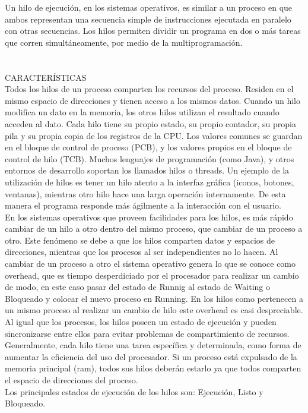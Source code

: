\documentclass[conference]{IEEEtran}
\begin{document}
Un hilo de ejecución, en los sistemas operativos, es similar a un proceso en que ambos representan una secuencia simple de instrucciones ejecutada en paralelo con otras secuencias. Los hilos permiten dividir un programa en dos o más tareas que corren simultáneamente, por medio de la multiprogramación. 
\\
\\
\\
CARACTERÍSTICAS 
\\
Todos los hilos de un proceso comparten los recursos del proceso. Residen en el mismo espacio de direcciones y tienen acceso a los mismos datos. Cuando un hilo modifica un dato en la memoria, los otros hilos utilizan el resultado cuando acceden al dato. Cada hilo tiene su propio estado, su propio contador, su propia pila y su propia  copia de los registros de la CPU. Los valores comunes se guardan en el bloque de control de proceso (PCB), y los valores propios en el bloque de control de hilo (TCB).
Muchos lenguajes de programación (como Java), y otros entornos de desarrollo soportan los llamados hilos o threads.
Un ejemplo de la utilización de hilos es tener un hilo atento a la interfaz gráfica (iconos, botones, ventanas), mientras otro hilo hace una larga operación internamente.
De esta manera el programa responde más ágilmente a la interacción con el usuario.
\\
En los sistemas operativos que proveen facilidades para los hilos, es más rápido cambiar de un hilo a otro dentro del mismo proceso, que cambiar de un proceso a otro. Este fenómeno se debe a que los hilos comparten datos y espacios de direcciones, mientras que los procesos al ser independientes no lo hacen. Al cambiar de un proceso a otro el sistema operativo genera lo que se conoce como overhead, que es tiempo desperdiciado por el procesador para realizar un cambio de modo, en este caso pasar del estado de Runnig al estado de Waiting o Bloqueado y colocar el nuevo proceso en Running. En los hilos como pertenecen a un mismo proceso al realizar un cambio de hilo este overhead es casi despreciable.
Al igual que los procesos, los hilos poseen un estado de ejecución y pueden sincronizarse entre ellos para evitar problemas de compartimiento de recursos. Generalmente, cada hilo tiene una tarea específica y determinada, como forma de aumentar la eficiencia del uso del procesador. 
Si un proceso está expulsado de la memoria principal (ram), todos sus hilos deberán estarlo ya que todos comparten el espacio de direcciones del proceso.
\\
Los principales estados de ejecución de los hilos son: Ejecución, Listo y Bloqueado.  
\end{document}
